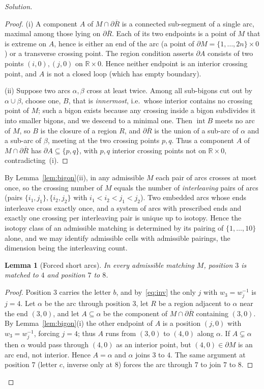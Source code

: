 \documentclass{amsart}
\newtheorem{lemma}{Lemma}
\theoremstyle{definition}
\newcommand{\RR}{\mathbb{R}}
\newcommand{\bdy}{\partial}
\begin{document}
\begin{proof}[Solution]
\begin{proof}
(i) A component $A$ of $M\cap\bdy\overline R$ is a connected sub-segment of a single arc,
maximal among those lying on $\bdy\overline R$. Each of its two endpoints is a point of $M$
that is extreme on $A$, hence is either an end of the arc (a point of
$\bdy M=\{1,\dots,2n\}\times0$) or a transverse crossing point. The region condition asserts
$\bdy A$ consists of two points $(i,0),(j,0)$ on $\RR\times0$. Hence neither endpoint is an
interior crossing point, and $A$ is not a closed loop (which has empty boundary).

(ii) Suppose two arcs $\alpha,\beta$ cross at least twice. Among all sub-bigons cut out by
$\alpha\cup\beta$, choose one, $B$, that is \emph{innermost}, i.e.\ whose interior contains no
crossing point of $M$; such a bigon exists because any crossing inside a bigon subdivides it
into smaller bigons, and we descend to a minimal one. Then $\operatorname{int}B$ meets no arc
of $M$, so $B$ is the closure of a region $R$, and $\bdy\overline R$ is the union of a
sub-arc of $\alpha$ and a sub-arc of $\beta$, meeting at the two crossing points $p,q$. Thus a
component $A$ of $M\cap\bdy\overline R$ has $\bdy A\subseteq\{p,q\}$, with $p,q$ interior
crossing points not on $\RR\times0$, contradicting~(i).
\end{proof}

By Lemma~\ref{lem:bigon}(ii), in any admissible $M$ each pair of arcs crosses at most once, so
the crossing number of $M$ equals the number of \emph{interleaving} pairs of arcs (pairs
$\{i_1,j_1\},\{i_2,j_2\}$ with $i_1<i_2<j_1<j_2$). Two embedded arcs whose ends interleave
cross exactly once, and a system of arcs with prescribed ends and exactly one crossing per
interleaving pair is unique up to isotopy. Hence the isotopy class of an admissible matching
is determined by its pairing of $\{1,\dots,10\}$ alone, and we may identify admissible cells
with admissible pairings, the dimension being the interleaving count.

\begin{lemma}[Forced short arcs]\label{lem:forced}
In every admissible matching $M$, position $3$ is matched to $4$ and position $7$ to $8$.
\end{lemma}

\begin{proof}
Position $3$ carries the letter $b$, and by~\eqref{eq:inv} the only $j$ with $w_3=w_j^{-1}$ is
$j=4$. Let $\alpha$ be the arc through position $3$, let $R$ be a region adjacent to $\alpha$
near the end $(3,0)$, and let $A\subseteq\alpha$ be the component of $M\cap\bdy\overline R$
containing $(3,0)$. By Lemma~\ref{lem:bigon}(i) the other endpoint of $A$ is a position
$(j,0)$ with $w_3=w_j^{-1}$, forcing $j=4$; thus $A$ runs from $(3,0)$ to $(4,0)$ along
$\alpha$. If $A\subsetneq\alpha$ then $\alpha$ would pass through $(4,0)$ as an interior
point, but $(4,0)\in\bdy M$ is an arc end, not interior. Hence $A=\alpha$ and $\alpha$ joins
$3$ to $4$. The same argument at position $7$ (letter $c$, inverse only at $8$) forces the arc
through $7$ to join $7$ to $8$.
\end{proof}


\end{proof}
\end{document}

